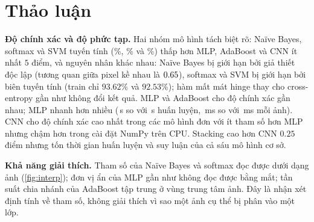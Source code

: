 \section{Thảo luận}
\label{sec:discussion}
\textbf{Độ chính xác và độ phức tạp.} Hai nhóm mô hình tách biệt rõ: Naïve Bayes, softmax và SVM tuyến tính (\accTestNB\%, \accTestSM\% và \svmTest\%) thấp hơn MLP, AdaBoost và CNN ít nhất $5$ điểm, và nguyên nhân khác nhau: Naïve Bayes bị giới hạn bởi giả thiết độc lập (tương quan giữa pixel kề nhau là $0.65$), softmax và SVM bị giới hạn bởi biên tuyến tính (train chỉ $93.62\%$ và $92.53\%$); hàm mất mát hinge thay cho cross-entropy gần như không đổi kết quả. MLP và AdaBoost cho độ chính xác gần nhau; MLP nhanh hơn nhiều (\fitMLP\,s so với \fitADA\,s huấn luyện, \latMLP\,ms so với \latADA\,ms mỗi ảnh). CNN cho độ chính xác cao nhất trong các mô hình đơn với ít tham số hơn MLP nhưng chậm hơn trong cài đặt NumPy trên CPU. Stacking cao hơn CNN $0.25$ điểm nhưng tốn thời gian huấn luyện và suy luận của cả sáu mô hình cơ sở.

\textbf{Khả năng giải thích.} Tham số của Naïve Bayes và softmax đọc được dưới dạng ảnh (\cref{fig:interp}); đơn vị ẩn của MLP gần như không đọc được bằng mắt; tần suất chia nhánh của AdaBoost tập trung ở vùng trung tâm ảnh. Đây là nhận xét định tính về tham số, không giải thích vì sao một ảnh cụ thể bị phân vào một lớp.
